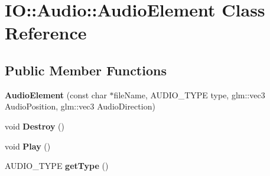 \hypertarget{class_i_o_1_1_audio_1_1_audio_element}{}\section{IO\+:\+:Audio\+:\+:Audio\+Element Class Reference}
\label{class_i_o_1_1_audio_1_1_audio_element}
\subsection*{Public Member Functions}
\begin{DoxyCompactItemize}
\item 
{\bfseries Audio\+Element} (const char $\ast$file\+Name, A\+U\+D\+I\+O\+\_\+\+T\+Y\+PE type, glm\+::vec3 Audio\+Position, glm\+::vec3 Audio\+Direction)\hypertarget{class_i_o_1_1_audio_1_1_audio_element_a5dc9b2edcd68bbb0c17231628dead103}{}\label{class_i_o_1_1_audio_1_1_audio_element_a5dc9b2edcd68bbb0c17231628dead103}

\item 
void {\bfseries Destroy} ()\hypertarget{class_i_o_1_1_audio_1_1_audio_element_a0e9ba45fc7d2f2f3228695120ca0e539}{}\label{class_i_o_1_1_audio_1_1_audio_element_a0e9ba45fc7d2f2f3228695120ca0e539}

\item 
void {\bfseries Play} ()\hypertarget{class_i_o_1_1_audio_1_1_audio_element_ae6dd75379691f87959a93110bd456be7}{}\label{class_i_o_1_1_audio_1_1_audio_element_ae6dd75379691f87959a93110bd456be7}

\item 
A\+U\+D\+I\+O\+\_\+\+T\+Y\+PE {\bfseries get\+Type} ()\hypertarget{class_i_o_1_1_audio_1_1_audio_element_aaa1929ed8868b03997adebca0a9f2fa7}{}\label{class_i_o_1_1_audio_1_1_audio_element_aaa1929ed8868b03997adebca0a9f2fa7}

\end{DoxyCompactItemize}
